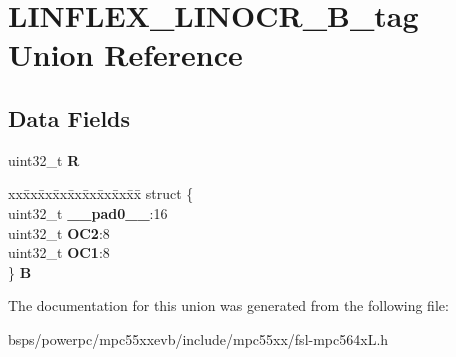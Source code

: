 \hypertarget{unionLINFLEX__LINOCR__32B__tag}{}\section{L\+I\+N\+F\+L\+E\+X\+\_\+\+L\+I\+N\+O\+C\+R\+\_\+B\+\_\+tag Union Reference}
\label{unionLINFLEX__LINOCR__32B__tag}
\subsection*{Data Fields}
\begin{DoxyCompactItemize}
\item 
\mbox{\label{unionLINFLEX__LINOCR__32B__tag_a2dae30c6f07e65d42ce90d9b26cc4453}} 
uint32\+\_\+t {\bfseries R}
\item 
\mbox{\label{unionLINFLEX__LINOCR__32B__tag_a214e49c3e67b2225e30e28b4dba63195}} 
\begin{tabbing}
xx\=xx\=xx\=xx\=xx\=xx\=xx\=xx\=xx\=\kill
struct \{\\
\>uint32\_t {\bfseries \_\_pad0\_\_}:16\\
\>uint32\_t {\bfseries OC2}:8\\
\>uint32\_t {\bfseries OC1}:8\\
\} {\bfseries B}\\

\end{tabbing}\end{DoxyCompactItemize}


The documentation for this union was generated from the following file\+:\begin{DoxyCompactItemize}
\item 
bsps/powerpc/mpc55xxevb/include/mpc55xx/fsl-\/mpc564x\+L.\+h\end{DoxyCompactItemize}
